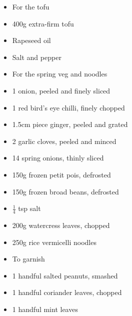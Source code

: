 \documentclass{book}
\begin{document}
\begin{itemize}
\item For the tofu 
\item 400g extra-firm tofu
\item Rapeseed oil 
\item Salt and pepper
\end{itemize}

\begin{itemize}
\item For the spring veg and noodles 
\item 1 onion, peeled and finely sliced 
\item 1 red bird’s eye chilli, finely chopped 
\item 1.5cm piece ginger, peeled and grated 
\item 2 garlic cloves, peeled and minced 
\item 14 spring onions, thinly sliced 
\item 150g frozen petit pois, defrosted 
\item 150g frozen broad beans, defrosted 
\item $\frac{1}{4}$ tsp salt 
\item 200g watercress leaves, chopped 
\item 250g rice vermicelli noodles 
\end{itemize}

\begin{itemize}
\item To garnish
\item 1 handful salted peanuts, smashed
\item 1 handful coriander leaves, chopped 
\item 1 handful mint leaves
\end{itemize}
\end{document}

